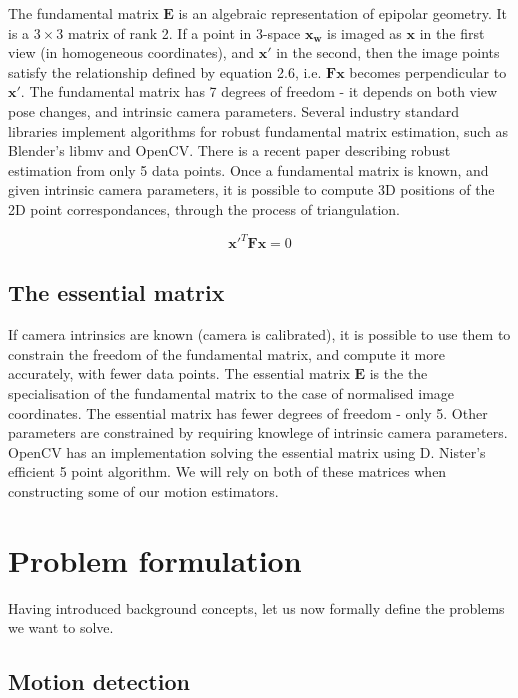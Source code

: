\documentclass[11pt,english]{report}
\begin{document}
The fundamental matrix $\mathbf{E}$ is an algebraic representation of epipolar geometry. It is a $3 \times 3$ matrix of rank 2. If a point in 3-space $\mathbf{x_w}$ is imaged as $\mathbf{x}$ in the first view (in homogeneous coordinates), and $\mathbf{x'}$ in the second, then the image points satisfy the relationship defined by equation 2.6\cite{hartley_zisserman_2004}, i.e. $\mathbf{Fx}$ becomes perpendicular to $\mathbf{x'}$. The fundamental matrix has 7 degrees of freedom - it depends on both view pose changes, and intrinsic camera parameters. Several industry standard libraries implement algorithms for robust fundamental matrix estimation, such as Blender's libmv and OpenCV. There is a recent paper describing robust estimation from only 5 data points\cite{8578130}. Once a fundamental matrix is known, and given intrinsic camera parameters, it is possible to compute 3D positions of the 2D point correspondances, through the process of triangulation.

\begin{equation}
	\mathbf{x'}^T \mathbf{F} \mathbf{x} = 0
\end{equation}

\subsection{The essential matrix}

If camera intrinsics are known (camera is calibrated), it is possible to use them to constrain the freedom of the fundamental matrix, and compute it more accurately, with fewer data points. The essential matrix $\mathbf{E}$ is the the specialisation of the fundamental matrix to the case of normalised image coordinates\cite{hartley_zisserman_2004}. The essential matrix has fewer degrees of freedom - only 5. Other parameters are constrained by requiring knowlege of intrinsic camera parameters. OpenCV has an implementation solving the essential matrix using D. Nister's efficient 5 point algorithm\cite{1211470}. We will rely on both of these matrices when constructing some of our motion estimators.

\section{Problem formulation}

Having introduced background concepts, let us now formally define the problems we want to solve.

\subsection{Motion detection}
\end{document}

